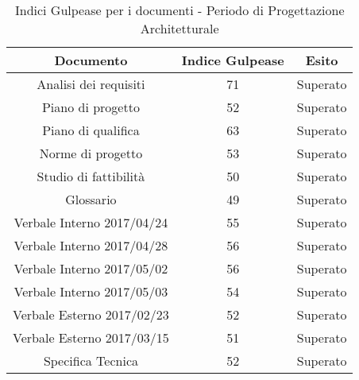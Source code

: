       
      \begin{table}[H]
        \centering
        \begin{tabular}{|c|c|c|}
          \hline
          \textbf{Documento} & \textbf{Indice Gulpease} & \textbf{Esito}\\
          \hline
          Analisi dei requisiti & 71  & Superato \\
          Piano di progetto & 52  & Superato \\
          Piano di qualifica  & 63  & Superato \\
          Norme di progetto & 53  & Superato \\
          Studio di fattibilità & 50  & Superato \\
          Glossario & 49  & Superato  \\
          Verbale Interno 2017/04/24 & 55  & Superato \\
          Verbale Interno 2017/04/28 & 56 & Superato \\
          Verbale Interno 2017/05/02 & 56  & Superato \\
          Verbale Interno 2017/05/03 & 54  & Superato \\
          Verbale Esterno 2017/02/23 & 52 & Superato \\
          Verbale Esterno 2017/03/15 & 51 & Superato \\
          Specifica Tecnica & 52 & Superato\\
          \hline
        \end{tabular}
        \caption{Indici Gulpease per i documenti - Periodo di Progettazione Architetturale}
      \end{table}

